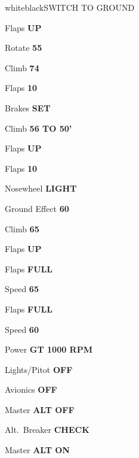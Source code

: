 \documentclass{article}
\begin{document}
\begin{multicols*}{3}
\begin{groupheading}{white}{black}{SWITCH TO GROUND}
\end{groupheading}

\colorbox{cyan}{}

\colorbox{cyan!70}{}

Flaps \dotfill \textbf{UP}

Rotate \dotfill \textbf{55}

Climb \dotfill \textbf{74}

\colorbox{cyan!70}{}

Flaps \dotfill \textbf{10}

Brakes \dotfill \textbf{SET}

Climb \dotfill \textbf{56 TO 50'}

Flaps \dotfill \textbf{UP}

\colorbox{cyan!70}{}

Flaps \dotfill \textbf{10}

Nosewheel \dotfill \textbf{LIGHT}

Ground Effect \dotfill \textbf{60}

Climb \dotfill \textbf{65}

Flaps \dotfill \textbf{UP}

\colorbox{cyan}{}

\colorbox{cyan!70}{}

Flaps \dotfill \textbf{FULL}

Speed \dotfill \textbf{65}

\colorbox{cyan!70}{}

Flaps \dotfill \textbf{FULL}

Speed \dotfill \textbf{60}

\colorbox{yellow!80!orange}{}

Power \dotfill \textbf{GT 1000 RPM}

Lights/Pitot \dotfill \textbf{OFF}

Avionics \dotfill \textbf{OFF}

Master \dotfill \textbf{ALT OFF}

Alt.\ Breaker \dotfill \textbf{CHECK}

Master \dotfill \textbf{ALT ON}


\end{multicols*}
\end{document}
